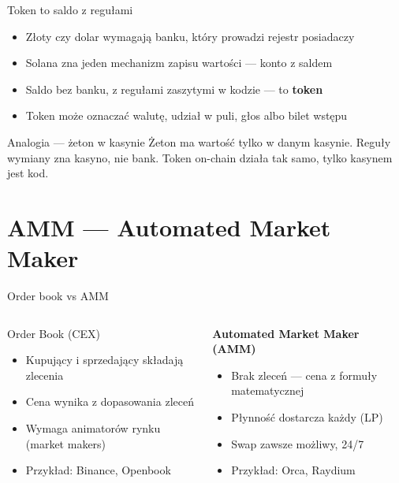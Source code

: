 \begin{frame}{Token to saldo z regułami}
  \begin{itemize}
    \item Złoty czy dolar wymagają banku, który prowadzi rejestr posiadaczy
    \item Solana zna jeden mechanizm zapisu wartości --- konto z saldem
    \item Saldo bez banku, z regułami zaszytymi w kodzie --- to \textbf{token}
    \item Token może oznaczać walutę, udział w puli, głos albo bilet wstępu
  \end{itemize}
  \vspace{0.25cm}
  \begin{exampleblock}{Analogia --- żeton w kasynie}
    Żeton ma wartość tylko w danym kasynie. Reguły wymiany zna kasyno,
    nie bank. Token on-chain działa tak samo, tylko kasynem jest kod.
  \end{exampleblock}
\end{frame}

\section{AMM --- Automated Market Maker}

\begin{frame}{Order book vs AMM}
  \addtocounter{beamerpauses}{-3}%
  \begin{columns}
      \begin{block}{Order Book (CEX)}
        \begin{itemize}
          \item Kupujący i sprzedający składają zlecenia
          \item Cena wynika z dopasowania zleceń
          \item Wymaga animatorów rynku (market makers)
          \item Przykład: Binance, Openbook
        \end{itemize}
      \end{block}

      \begin{block}{\textbf{Automated Market Maker (AMM)}}
        \begin{itemize}
          \item Brak zleceń --- cena z formuły matematycznej
          \item Płynność dostarcza każdy (LP)
          \item Swap zawsze możliwy, 24/7
          \item Przykład: Orca, Raydium
        \end{itemize}
      \end{block}
  \end{columns}
\end{frame}

